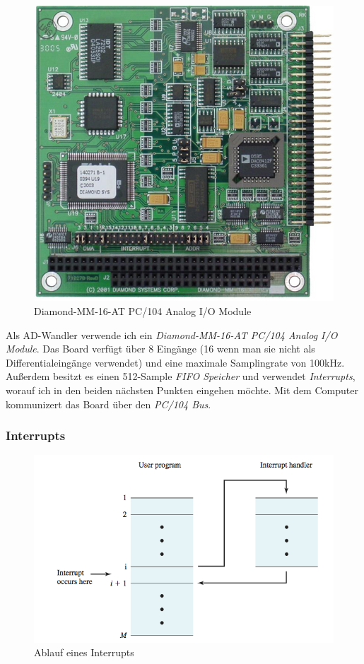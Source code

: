 \documentclass[12pt,a4paper,twoside,BCOR=12.5mm]{scrartcl}
\begin{document}
\begin{figure}[H]
\centering
\includegraphics[scale=.4]{hardwareimages/diamondmm16at.jpg}
\caption{Diamond-MM-16-AT PC/104 Analog I/O Module}
\label{diamond}
\end{figure}



Als AD-Wandler verwende ich ein \textit{Diamond-MM-16-AT PC/104 Analog I/O Module}. Das Board verfügt über 8 Eingänge (16 wenn man sie nicht als Differential\-eingänge verwendet) und eine maximale Samplingrate von 100kHz. Außerdem besitzt es einen 512-Sample \textit{FIFO Speicher} und verwendet \textit{Interrupts}, worauf ich in den beiden nächsten Punkten eingehen möchte.
Mit dem Computer kommunizert das Board über den \textit{PC/104 Bus}.


\subsubsection{Interrupts}

\begin{figure}[H]
\centering
\includegraphics[scale=1.4]{interrupt.png}
\caption{Ablauf eines Interrupts \citep{Stallings:2000uq}}
\label{interrupt}
\end{figure}
\end{document}

